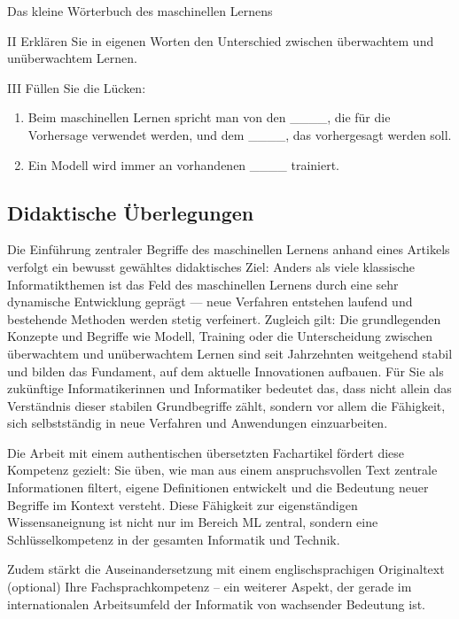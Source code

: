 \begin{lpu}{Das kleine Wörterbuch des maschinellen Lernens}
\begin{aufgabe}{II}
Erklären Sie in eigenen Worten den Unterschied zwischen überwachtem und unüberwachtem Lernen.
\end{aufgabe}

\begin{aufgabe}{III}
Füllen Sie die Lücken:  
\begin{enumerate}
  \item Beim maschinellen Lernen spricht man von den \_\_\_\_, die für die Vorhersage verwendet werden, und dem \_\_\_\_, das vorhergesagt werden soll.  
  \item Ein Modell wird immer an vorhandenen \_\_\_\_ trainiert.  
\end{enumerate}
\end{aufgabe}

\end{lpu}

\subsection*{Didaktische Überlegungen}
Die Einführung zentraler Begriffe des maschinellen Lernens anhand eines Artikels verfolgt ein bewusst gewähltes didaktisches Ziel: Anders als viele klassische Informatikthemen ist das Feld des maschinellen Lernens durch eine sehr dynamische Entwicklung geprägt — neue Verfahren entstehen laufend und bestehende Methoden werden stetig verfeinert. Zugleich gilt: Die grundlegenden Konzepte und Begriffe wie Modell, Training oder die Unterscheidung zwischen überwachtem und unüberwachtem Lernen sind seit Jahrzehnten weitgehend stabil und bilden das Fundament, auf dem aktuelle Innovationen aufbauen. Für Sie als zukünftige Informatikerinnen und Informatiker bedeutet das, dass nicht allein das Verständnis dieser stabilen Grundbegriffe zählt, sondern vor allem die Fähigkeit, sich selbstständig in neue Verfahren und Anwendungen einzuarbeiten.

Die Arbeit mit einem authentischen übersetzten Fachartikel fördert diese Kompetenz gezielt: Sie üben, wie man aus einem anspruchsvollen Text zentrale Informationen filtert, eigene Definitionen entwickelt und die Bedeutung neuer Begriffe im Kontext versteht. Diese Fähigkeit zur eigenständigen Wissensaneignung ist nicht nur im Bereich ML zentral, sondern eine Schlüsselkompetenz in der gesamten Informatik und Technik.

Zudem stärkt die Auseinandersetzung mit einem englischsprachigen Originaltext (optional) Ihre Fachsprachkompetenz – ein weiterer Aspekt, der gerade im internationalen Arbeitsumfeld der Informatik von wachsender Bedeutung ist.

